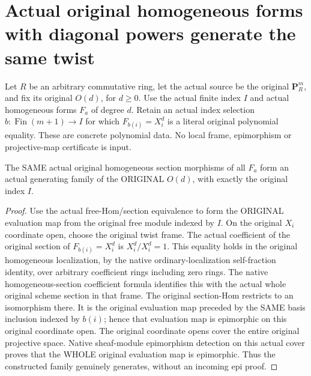 \section{Actual original homogeneous forms with diagonal powers generate the same twist}

Let $R$ be an arbitrary commutative ring, let the actual source be the original
$\mathbf P^m_R$, and fix its original $O(d)$, for $d\ge0$. Use the actual finite
index $I$ and actual homogeneous forms $F_a$ of degree $d$. Retain an actual
index selection $b:\operatorname{Fin}(m+1)\to I$ for which
$F_{b(i)}=X_i^d$ is a literal original polynomial equality. These are concrete
polynomial data. No local frame, epimorphism or projective-map certificate is input.

\begin{definition}
\label{def:central-embedding-original-homogeneous-forms-generating-family}
\leanok
The SAME actual original homogeneous section morphisms of all $F_a$ form an
actual generating family of the ORIGINAL $O(d)$, with exactly the original index $I$.
\end{definition}
\begin{proof}
Use the actual free-Hom/section equivalence to form the ORIGINAL evaluation map
from the original free module indexed by $I$. On the original $X_i$ coordinate
open, choose the original twist frame. The actual coefficient of the original
section of $F_{b(i)}=X_i^d$ is $X_i^d/X_i^d=1$. This equality holds in the original
homogeneous localization, by the native ordinary-localization self-fraction
identity, over arbitrary coefficient rings including zero rings. The native
homogeneous-section coefficient formula identifies this with the actual whole
original scheme section in that frame. The original section-Hom restricts to an
isomorphism there. It is the original evaluation map preceded by the SAME basis
inclusion indexed by $b(i)$; hence that evaluation map is epimorphic on this
original coordinate open. The original coordinate opens cover the entire
original projective space. Native sheaf-module epimorphism detection on this
actual cover proves that the WHOLE original evaluation map is epimorphic.
Thus the constructed family genuinely generates, without an incoming epi proof.
\end{proof}

